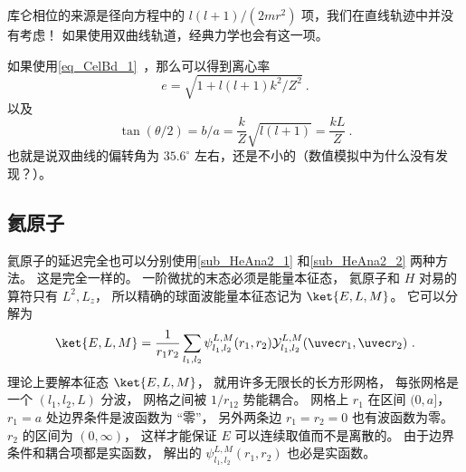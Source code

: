 库仑相位的来源是径向方程中的 $l(l+1)/(2mr^2)$ 项，我们在直线轨迹中并没有考虑！ 如果使用双曲线轨道，经典力学也会有这一项。%

如果使用\autoref{eq_CelBd_1}~，那么可以得到离心率
\begin{equation}
e = \sqrt{1 + l(l+1)k^2/Z^2}~.
\end{equation}
以及
\begin{equation}
\tan(\theta/2) = b/a = \frac{k}{Z}\sqrt{l(l+1)} = \frac{kL}{Z}~.
\end{equation}
也就是说双曲线的偏转角为 $35.6^\circ$ 左右，还是不小的（数值模拟中为什么没有发现？）。

\subsection{氦原子}
氦原子的延迟完全也可以分别使用\autoref{sub_HeAna2_1} 和\autoref{sub_HeAna2_2} 两种方法。 这是完全一样的。 一阶微扰的末态必须是能量本征态， 氦原子和 $H$ 对易的算符只有 $L^2, L_z$， 所以精确的球面波能量本征态记为 $\ket{E,L,M}$。 它可以分解为
\begin{equation}
\ket{E,L,M} = \frac{1}{r_1r_2}\sum_{l_1,l_2}\psi_{l_1,l_2}^{L, M}(r_1, r_2)\mathcal Y_{l_1,l_2}^{L, M}(\uvec r_1, \uvec r_2)~.
\end{equation}
理论上要解本征态 $\ket{E,L,M}$， 就用许多无限长的长方形网格， 每张网格是一个 $(l_1,l_2,L)$ 分波， 网格之间被 $1/r_{12}$ 势能耦合。 网格上 $r_1$ 在区间 $(0,a]$， $r_1 = a$ 处边界条件是波函数为 “零”， 另外两条边 $r_1 = r_2 = 0$ 也有波函数为零。 $r_2$ 的区间为 $(0,\infty)$， 这样才能保证 $E$ 可以连续取值而不是离散的。 由于边界条件和耦合项都是实函数， 解出的 $\psi_{l_1,l_2}^{L, M}(r_1, r_2)$ 也必是实函数。

